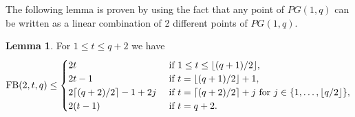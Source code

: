 \documentclass[11pt,a4paper]{article}
\theoremstyle{definition}
\newtheorem{lemma}[theorem]{Lemma}
\newcommand{\fb}{\textnormal{FB}}
\begin{document}
The following lemma is proven by using the fact that any point of $PG(1,q)$ can be written as a linear combination of 2 different points of $PG(1,q).$

\begin{lemma}
\label{upper_bound_k=2}
For $1 \le t \le q+2$ we have 
$$\fb(2,t,q) \le \begin{cases}
        2t & \textnormal{ if } 1 \le t \le \lfloor (q+1)/2 \rfloor,\\
        2t-1 & \textnormal{ if } t =\lfloor (q+1)/2 \rfloor +1, \,\\
        2\lceil (q+2)/2 \rceil-1+2j & \textnormal{ if } t=\lceil (q+2)/2 \rceil + j \mbox{ for }j \in\{1,\ldots,\lfloor q/2 \rfloor\},\\
        2(t-1) & \textnormal{ if } t=q+2.
    \end{cases}$$
\end{lemma}
\end{document}

